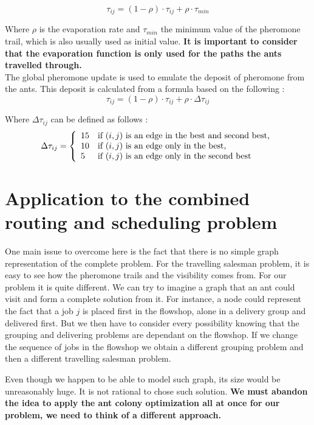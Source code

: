 \documentclass[UTF8, twoside]{EPURapport}
\begin{document}
\[
\tau_{ij} = (1-\rho) \cdot \tau_{ij}+\rho \cdot \tau_{min}
\]

	Where $\rho$ is the evaporation rate and $\tau_{min}$ the minimum value of the pheromone trail, which is also usually used as initial value. \textbf{It is important to consider that the evaporation function is only used for the paths the ants travelled through.}
\\

	The global pheromone update is used to emulate the deposit of pheromone from the ants. This deposit is calculated from a formula based on the following :
	\\
	
\[
\tau_{ij} = (1-\rho) \cdot \tau_{ij}+\rho \cdot \Delta\tau_{ij}
\]

	Where $\Delta\tau_{ij}$ can be defined as follows :
	\\
	
\[
\Delta\tau_{ij} = \left\{ 
\begin{array}{l l}
15 & \text{if } (i,j) \text{ is an edge in the best and second best,}\\
10 & \text{if } (i,j) \text{ is an edge only in the best,}\\
5 & \text{if } (i,j) \text{ is an edge only in the second best}\\
\end{array}
\right.
\]

\section{Application to the combined routing and scheduling problem}

	\hspace{4ex}One main issue to overcome here is the fact that there is no simple graph representation of the complete problem. For the travelling salesman problem, it is easy to see how the pheromone trails and the visibility comes from. For our problem it is quite different. We can try to imagine a graph that an ant could visit and form a complete solution from it. For instance, a node could represent the fact that a job $j$ is placed first in the flowshop, alone in a delivery group and delivered first. But we then have to consider every possibility knowing that the grouping and delivering problems are dependant on the flowshop. If we change the sequence of jobs in the flowshop we obtain a different grouping problem and then a different travelling salesman problem.
	
	Even though we happen to be able to model such graph, its size would be unreasonably huge. It is not rational to chose such solution. \textbf{We must abandon the idea to apply the ant colony optimization all at once for our problem, we need to think of a different approach.}
	\\
	
\end{document}
